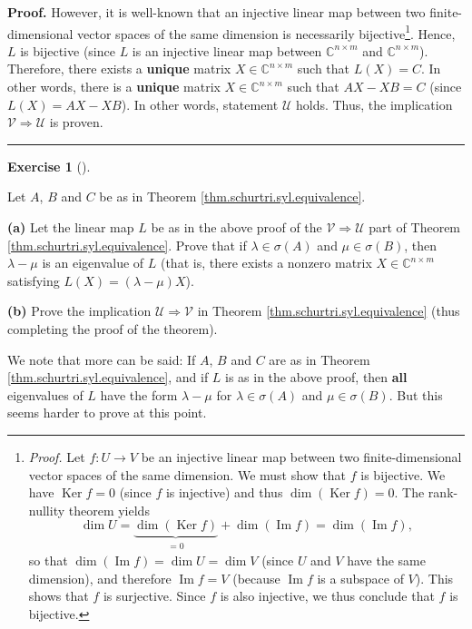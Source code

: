 \documentclass[numbers=enddot,12pt,final,onecolumn,notitlepage]{scrartcl}%
\newcounter{exer}
\numberwithin{exer}{subsection}
\theoremstyle{definition}
\newtheorem{exmp}[exer]{Exercise}
\newenvironment{exercise}[1][]
{\begin{exmp}[#1]\begin{leftbar}}
{\end{leftbar}\end{exmp}}
\newenvironment{proof}[1][Proof]{\noindent\textbf{#1.} }{\ \rule{0.5em}{0.5em}}
\begin{document}
\begin{proof}
However, it is well-known that an injective linear map between two
finite-dimensional vector spaces of the same dimension is necessarily
bijective\footnote{\textit{Proof.} Let $f:U\rightarrow V$ be an injective
linear map between two finite-dimensional vector spaces of the same dimension.
We must show that $f$ is bijective. We have $\operatorname*{Ker}f=0$ (since
$f$ is injective) and thus $\dim\left(  \operatorname*{Ker}f\right)  =0$. The
rank-nullity theorem yields%
\[
\dim U=\underbrace{\dim\left(  \operatorname*{Ker}f\right)  }_{\substack{=0}%
}+\dim\left(  \operatorname{Im}f\right)  =\dim\left(  \operatorname{Im}%
f\right)  ,
\]
so that $\dim\left(  \operatorname{Im}f\right)  =\dim U=\dim V$ (since $U$ and
$V$ have the same dimension), and therefore $\operatorname{Im}f=V$ (because
$\operatorname{Im}f$ is a subspace of $V$). This shows that $f$ is surjective.
Since $f$ is also injective, we thus conclude that $f$ is bijective.}. Hence,
$L$ is bijective (since $L$ is an injective linear map between $\mathbb{C}%
^{n\times m}$ and $\mathbb{C}^{n\times m}$). Therefore, there exists a
\textbf{unique} matrix $X\in\mathbb{C}^{n\times m}$ such that $L\left(
X\right)  =C$. In other words, there is a \textbf{unique} matrix
$X\in\mathbb{C}^{n\times m}$ such that $AX-XB=C$ (since $L\left(  X\right)
=AX-XB$). In other words, statement $\mathcal{U}$ holds. Thus, the implication
$\mathcal{V}\Longrightarrow\mathcal{U}$ is proven.
\end{proof}

\begin{exercise}
\label{exe.schurtri.syl.sigA-B} Let $A$, $B$ and $C$ be as in Theorem
\ref{thm.schurtri.syl.equivalence}. \medskip

\textbf{(a)} Let the linear map $L$ be as in the above proof of the
$\mathcal{V}\Longrightarrow\mathcal{U}$ part of Theorem
\ref{thm.schurtri.syl.equivalence}. Prove that if $\lambda\in\sigma\left(
A\right)  $ and $\mu\in\sigma\left(  B\right)  $, then $\lambda-\mu$ is an
eigenvalue of $L$ (that is, there exists a nonzero matrix $X\in\mathbb{C}%
^{n\times m}$ satisfying $L\left(  X\right)  =\left(  \lambda-\mu\right)  X$).
\medskip

\textbf{(b)} Prove the implication $\mathcal{U}\Longrightarrow\mathcal{V}$ in
Theorem \ref{thm.schurtri.syl.equivalence} (thus completing the proof of the theorem).
\end{exercise}

We note that more can be said: If $A$, $B$ and $C$ are as in Theorem
\ref{thm.schurtri.syl.equivalence}, and if $L$ is as in the above proof, then
\textbf{all} eigenvalues of $L$ have the form $\lambda-\mu$ for $\lambda
\in\sigma\left(  A\right)  $ and $\mu\in\sigma\left(  B\right)  $. But this
seems harder to prove at this point. \medskip%
\end{document}
